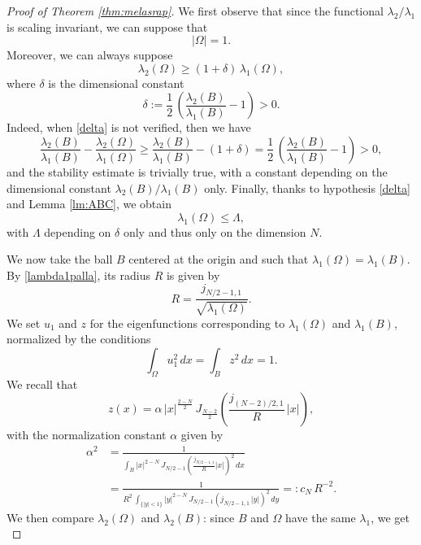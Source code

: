 \documentclass{amsart}
\theoremstyle{definition}
\numberwithin{equation}{section}
\begin{document}
\begin{proof}[Proof of Theorem \ref{thm:melasrap}]
We first observe that since the functional $\lambda_2/\lambda_1$ is scaling invariant, we can suppose that 
\begin{equation}
\label{1}
|\Omega|=1.
\end{equation}
Moreover, we can always suppose
\begin{equation}
\label{delta}
\lambda_2(\Omega)\ge (1+\delta)\,\lambda_1(\Omega),
\end{equation}
where $\delta$ is the dimensional constant
\[
\delta:=\frac{1}{2}\,\left(\frac{\lambda_2(B)}{\lambda_1(B)}-1\right)>0.
\] 
Indeed, when \eqref{delta} is not verified, then we have
\[
\frac{\lambda_2(B)}{\lambda_1(B)}-\frac{\lambda_2(\Omega)}{\lambda_1(\Omega)}\ge \frac{\lambda_2(B)}{\lambda_1(B)}-(1+\delta)=\frac{1}{2}\,\left(\frac{\lambda_2(B)}{\lambda_1(B)}-1\right)>0,
\]
and the stability estimate is trivially true, with a constant depending on the dimensional constant $\lambda_2(B)/\lambda_1(B)$ only. Finally, thanks to hypothesis \eqref{delta} and Lemma \ref{lm:ABC}, we obtain 
\begin{equation}
\label{nosqueeze}
\lambda_1(\Omega)\le \Lambda,
\end{equation}
with $\Lambda$ depending on $\delta$ only and thus only on the dimension $N$.
\par
We now take the ball $B$ centered at the origin and such that $\lambda_1(\Omega)=\lambda_1(B)$. By \eqref{lambda1palla}, its radius $R$ is given by
\[
R=\frac{j_{N/2-1,1}}{\sqrt{\lambda_1(\Omega)}}.
\]
We set $u_1$ and $z$ for the eigenfunctions corresponding to $\lambda_1(\Omega)$ and $\lambda_1(B)$, normalized by the conditions
\[
\int_\Omega u_1^2\, dx=\int_B z^2\, dx=1.
\] 
We recall that
\[
z(x)=\alpha\,|x|^\frac{2-N}{2}\,J_\frac{N-2}{2}\left(\frac{j_{(N-2)/2,1}}{R}\,|x|\right),
\] 
with the normalization constant $\alpha$ given by
\begin{equation}
\label{costantedim}
\begin{split}
\alpha^2&=\frac{1}{\displaystyle\int_B|x|^{2-N}\,J_{N/2-1}\left(\frac{j_{N/2-1,1}}{R} |x|\right)^2\, dx }\\
&=\frac{1}{R^2\,\displaystyle\int_{\{|y|<1\}} |y|^{2-N}\, J_{N/2-1}\left(j_{N/2-1,1}\, |y|\right)^2\, dy}=:c_N\, R^{-2}. 
\end{split}
\end{equation}
We then compare $\lambda_2(\Omega)$ and $\lambda_2(B)$: since $B$ and $\Omega$ have the same $\lambda_1$, we get
\begin{equation}

\end{equation}
\end{proof}
\end{document}

